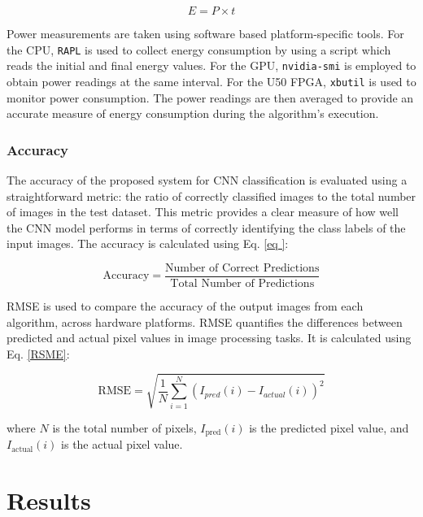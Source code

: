 \documentclass[]{spie}  %
\begin{document}
\begin{equation}\label{eq:Energy}
E = P \times t
\end{equation}

Power measurements are taken using software based platform-specific tools. For the CPU, \texttt{RAPL} is used to collect energy consumption by using a script which reads the initial and final energy values. For the GPU, \texttt{nvidia-smi} is employed to obtain power readings at the same interval. For the U50 FPGA, \texttt{xbutil} is used to monitor power consumption. The power readings are then averaged to provide an accurate measure of energy consumption during the algorithm's execution.

\subsubsection{Accuracy}
The accuracy of the proposed system for CNN classification is evaluated using a straightforward metric: the ratio of correctly classified images to the total number of images in the test dataset. This metric provides a clear measure of how well the CNN model performs in terms of correctly identifying the class labels of the input images. The accuracy is calculated using Eq. \ref{eq
}:

\begin{equation}\label{eq
}
\text{Accuracy} = \frac{\text{Number of Correct Predictions}}{\text{Total Number of Predictions}}
\end{equation}

RMSE is used to compare the accuracy of the output images from each algorithm, across hardware platforms. RMSE quantifies the differences between predicted and actual pixel values in image processing tasks. It is calculated using Eq. \ref{RSME}:

\begin{equation}\label{RSME}
\text{RMSE} = \sqrt{\frac{1}{N} \sum_{i=1}^{N} (I_{pred}(i) - I_{actual}(i))^2}
\end{equation}

where \( N \) is the total number of pixels, \( I_{\text{pred}}(i) \) is the predicted pixel value, and \( I_{\text{actual}}(i) \) is the actual pixel value.



\section{Results}
\label{sec:results}
\end{document}
